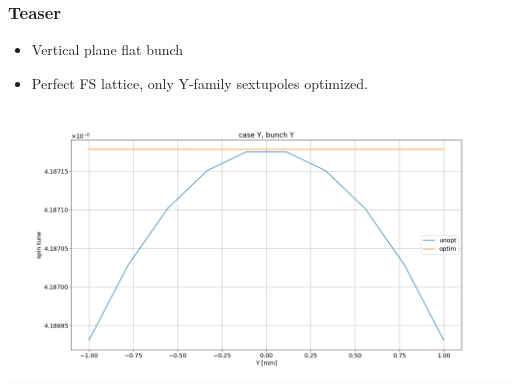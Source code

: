 \documentclass{beamer}
\begin{document}
\begin{frame}\frametitle{Teaser}
  \begin{itemize}
  \item Vertical plane flat bunch
  \item Perfect FS lattice, only Y-family sextupoles optimized.
  \end{itemize}
  \centering
  \includegraphics[width=\linewidth]{../img/SEMINAR/spin_tune_decoh_plot}
\end{frame}
\end{document}

